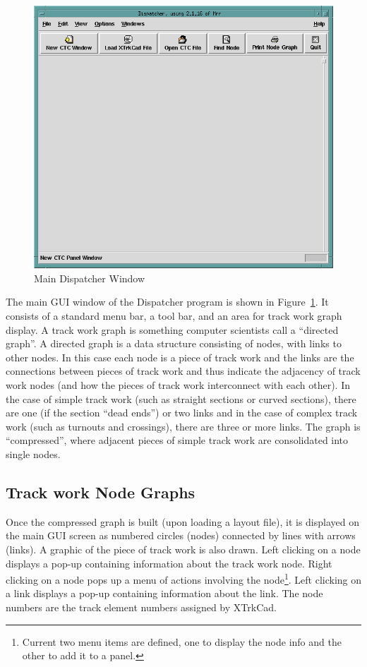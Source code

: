 \begin{figure}[hbpt]
\begin{centering}
\includegraphics[width=5in]{DISPMainGUI.png}
\caption{Main Dispatcher Window}
\label{fig:dispatcher:mainDispatcher}
\end{centering}
\end{figure}
The main GUI window of the Dispatcher program is shown in
Figure~\ref{fig:dispatcher:mainDispatcher}. It consists of a standard
menu bar, a tool bar, and an area for track work graph display. A
track work graph is something computer scientists call a ``directed
graph''.  A directed graph is a data structure consisting of nodes,
with links to other nodes.  In this case each node is a piece of
track work and the links are the connections between pieces of track work
and thus indicate the adjacency of track work nodes (and how the pieces
of track work interconnect with each other).  In the case of simple
track work (such as straight sections or curved sections), there are one
(if the section ``dead ends'') or two links and in the case of complex
track work (such as turnouts and crossings), there are three or more
links.  The graph is ``compressed'', where adjacent pieces of simple
track work are consolidated into single nodes. 

\subsection{Track work Node Graphs}

Once the compressed graph is built (upon loading a layout file), it is
displayed on the main GUI screen as numbered circles (nodes) connected
by lines with arrows (links).  A graphic of the piece of track work is
also drawn. Left clicking on a node displays a pop-up containing
information about the track work node.  Right clicking on a node pops up
a menu of actions involving the node\footnote{Current two menu items
are defined, one to display the node info and the other to add it to a
panel.}. Left clicking on a link displays a pop-up containing
information about the link.  The node numbers are the track element
numbers assigned by XTrkCad.

